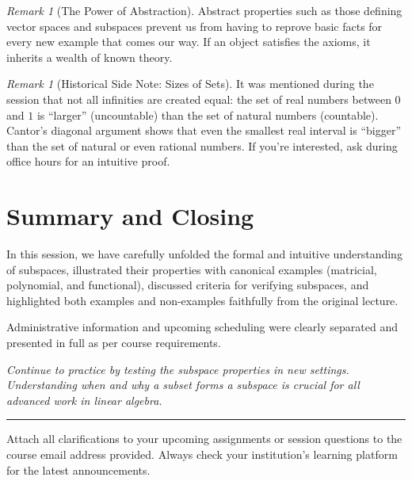 \documentclass[11pt,a4paper]{article}
\theoremstyle{definition}
\theoremstyle{plain}
\theoremstyle{remark}
\newtheorem{remark}[definition]{Remark}
\begin{document}
\begin{remark}[The Power of Abstraction]
Abstract properties such as those defining vector spaces and subspaces prevent us from having to reprove basic facts for every new example that comes our way. If an object satisfies the axioms, it inherits a wealth of known theory.
\end{remark}

\begin{remark}[Historical Side Note: Sizes of Sets]
It was mentioned during the session that not all infinities are created equal: the set of real numbers between $0$ and $1$ is ``larger'' (uncountable) than the set of natural numbers (countable). Cantor’s diagonal argument shows that even the smallest real interval is ``bigger'' than the set of natural or even rational numbers. If you're interested, ask during office hours for an intuitive proof.
\end{remark}

\section*{Summary and Closing}

In this session, we have carefully unfolded the formal and intuitive understanding of subspaces, illustrated their properties with canonical examples (matricial, polynomial, and functional), discussed criteria for verifying subspaces, and highlighted both examples and non-examples faithfully from the original lecture. 

Administrative information and upcoming scheduling were clearly separated and presented in full as per course requirements.

\textit{Continue to practice by testing the subspace properties in new settings. Understanding when and why a subset forms a subspace is crucial for all advanced work in linear algebra.}

\vspace{1em}
\hrule
\vspace{1em}
\begin{administrative_note}[breakable, title=End of Administrative Section (see intro for logistics)]
\vspace{1em}
Attach all clarifications to your upcoming assignments or session questions to the course email address provided. Always check your institution’s learning platform for the latest announcements.
\vspace{0.7em}
\end{administrative_note}
\end{document}
